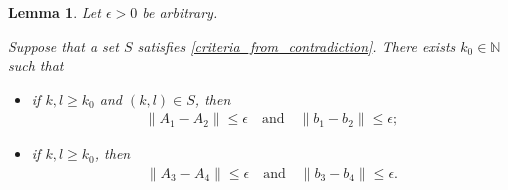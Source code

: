 \documentclass{article}
\newtheorem{lemma}[theorem]{Lemma}
\theoremstyle{case}
\numberwithin{theorem}{subsection}
\newcommand{\naturals}{\mathbb N}
\begin{document}
\begin{lemma}
\label{the_polyhedron_are_close}
Let $\epsilon > 0$ be arbitrary.

Suppose that a set $S$ satisfies \cref{criteria_from_contradiction}.
There exists $k_0 \in \naturals$ such that 

\begin{itemize}
\item if $k, l \ge k_0$ and $(k, l) \in S$, then
\begin{align*}
\left\|A_1 - A_2\right\| \le \epsilon
\quad \textrm{and} \quad
\left\|b_1 - b_2\right\| \le \epsilon;
\end{align*}
\item if $k, l \ge k_0$, then
\begin{align*}
\left\|A_3 - A_4\right\| \le \epsilon
\quad \textrm{and} \quad
\left\|b_3 - b_4\right\| \le \epsilon.
\end{align*}
\end{itemize}

\end{lemma}
\end{document}
